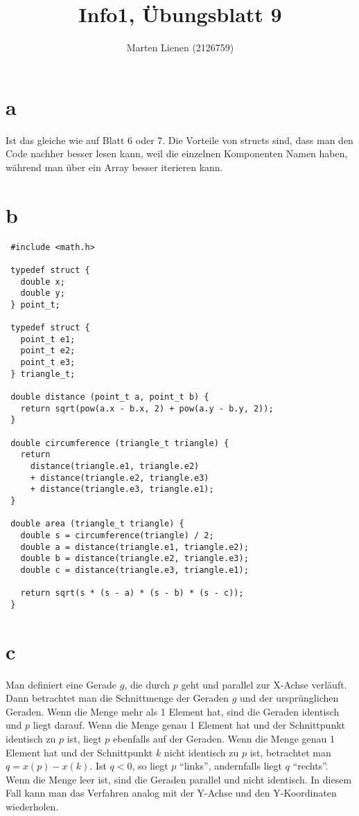 \documentclass[a4paper,10pt]{article}
\title{Info1, Übungsblatt 9}
\author{Marten Lienen (2126759)}
\begin{document}
\maketitle

\section*{a}

Ist das gleiche wie auf Blatt 6 oder 7.
Die Vorteile von structs sind, dass man den Code nachher besser lesen kann, weil die einzelnen Komponenten Namen haben, während man über ein Array besser iterieren kann.

\section*{b}

\lstset{language=c}
\begin{lstlisting}
 #include <math.h>

 typedef struct {
   double x;
   double y;
 } point_t;

 typedef struct {
   point_t e1;
   point_t e2;
   point_t e3;
 } triangle_t;

 double distance (point_t a, point_t b) {
   return sqrt(pow(a.x - b.x, 2) + pow(a.y - b.y, 2));
 }

 double circumference (triangle_t triangle) {
   return
     distance(triangle.e1, triangle.e2)
     + distance(triangle.e2, triangle.e3)
     + distance(triangle.e3, triangle.e1);
 }

 double area (triangle_t triangle) {
   double s = circumference(triangle) / 2;
   double a = distance(triangle.e1, triangle.e2);
   double b = distance(triangle.e2, triangle.e3);
   double c = distance(triangle.e3, triangle.e1);
  
   return sqrt(s * (s - a) * (s - b) * (s - c));
 }
\end{lstlisting}

\section*{c}

Man definiert eine Gerade $g$, die durch $p$ geht und parallel zur X-Achse verläuft.
Dann betrachtet man die Schnittmenge der Geraden $g$ und der ursprünglichen Geraden.
Wenn die Menge mehr als 1 Element hat, sind die Geraden identisch und $p$ liegt darauf.
Wenn die Menge genau 1 Element hat und der Schnittpunkt identisch zu $p$ ist, liegt $p$ ebenfalls auf der Geraden.
Wenn die Menge genau 1 Element hat und der Schnittpunkt $k$ nicht identisch zu $p$ ist, betrachtet man $q = x(p) - x(k)$.
Ist $q < 0$, so liegt $p$ ``links'', andernfalls liegt $q$ ``rechts''.
Wenn die Menge leer ist, sind die Geraden parallel und nicht identisch.
In diesem Fall kann man das Verfahren analog mit der Y-Achse und den Y-Koordinaten wiederholen.
\end{document}
